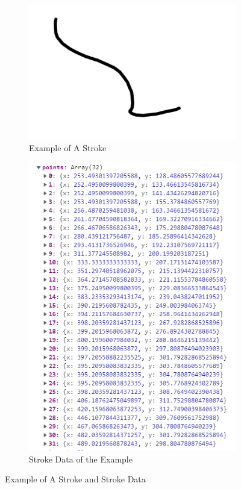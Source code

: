 \documentclass[12pt,twoside]{report}
\begin{document}
\begin{figure}
    \centering
    \begin{subfigure}{0.6\linewidth}
        \centering
        \includegraphics[width=\linewidth, frame]{figures/stroke-example.png}
        \caption{Example of A Stroke}
    \end{subfigure}
    \begin{subfigure}{0.6\linewidth}
        \centering
        \includegraphics[width=\linewidth, frame]{figures/stroke-data-example.png}
        \caption{Stroke Data of the Example}
    \end{subfigure}
    \caption{Example of A Stroke and Stroke Data}
    \label{fig:stroke-sample}
\end{figure}
\end{document}
